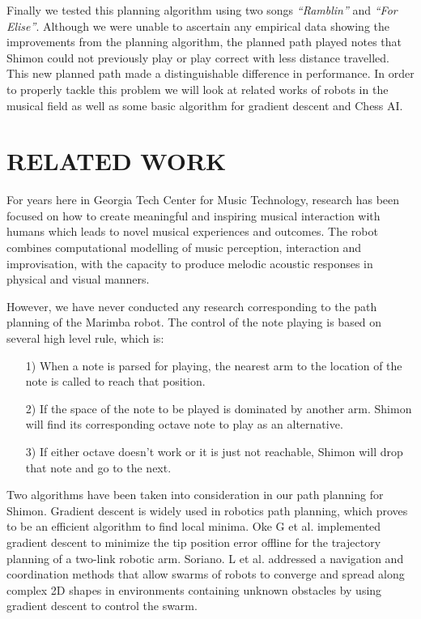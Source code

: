 \documentclass[letterpaper, 10 pt, conference]{ieeeconf}  %
\begin{document}
Finally we tested this planning algorithm using two songs \textit{``Ramblin''} and \textit{``For Elise''}.  Although we were unable to ascertain any empirical data showing the improvements from the planning algorithm, the planned path played notes that Shimon could not previously play or play correct with less distance travelled.  This new planned path made a distinguishable difference in performance.  In order to properly tackle this problem we will look at related works of robots in the musical field as well as some basic algorithm for gradient descent and Chess AI.


\section{RELATED WORK}

For years here in Georgia Tech Center for Music Technology, research has been focused on how to create meaningful and inspiring musical interaction with humans which leads to novel musical experiences and outcomes. The robot combines computational modelling of music perception, interaction and improvisation, with the capacity to produce melodic acoustic responses in physical \cite{HofWei10} and visual \cite{Weinberg11} manners. 

However, we have never conducted any research corresponding to the path planning of the Marimba robot. The control of the note playing is based on several high level rule, which is:

\begin{itemize}
	\item[1)] When a note is parsed for playing, the nearest arm to the location of the note is called to reach that position.
	\item[2)] If the space of the note to be played is dominated by another arm. Shimon will find its corresponding octave note to play as an alternative.
	\item[3)] If either octave doesn't work or it is just not reachable, Shimon will drop that note and go to the next. 
\end{itemize}

Two algorithms have been taken into consideration in our path planning for Shimon. Gradient descent is widely used in robotics path planning, which proves to be an efficient algorithm to find local minima.  Oke G et al. \cite{OkeIst01} implemented gradient descent to minimize the tip position error offline for the trajectory planning of a two-link robotic arm.  Soriano. L et al. \cite{MarCha08} addressed a navigation and coordination methods that allow swarms of robots to converge and spread along complex 2D shapes in environments containing unknown obstacles by using gradient descent to control the swarm.	
			
\end{document}
